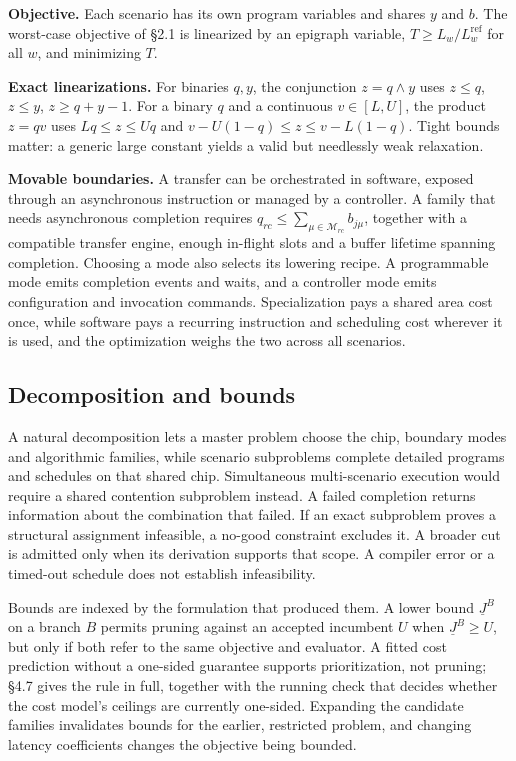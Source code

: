 \documentclass[11pt]{article}
\begin{document}
\textbf{Objective.} Each scenario has its own program variables and shares \(y\) and \(b\). The worst-case objective of §2.1 is linearized by an epigraph variable, \(T\ge L_w/L^{\mathrm{ref}}_w\) for all \(w\), and minimizing \(T\).

\textbf{Exact linearizations.} For binaries \(q,y\), the conjunction \(z=q\land y\) uses \(z\le q\), \(z\le y\), \(z\ge q+y-1\). For a binary \(q\) and a continuous \(v\in[L,U]\), the product \(z=qv\) uses \(Lq\le z\le Uq\) and \(v-U(1-q)\le z\le v-L(1-q)\). Tight bounds matter: a generic large constant yields a valid but needlessly weak relaxation.

\textbf{Movable boundaries.} A transfer can be orchestrated in software, exposed through an asynchronous instruction or managed by a controller. A family that needs asynchronous completion requires \(q_{rc}\le\sum_{\mu\in\mathcal M_{rc}}b_{j\mu}\), together with a compatible transfer engine, enough in-flight slots and a buffer lifetime spanning completion. Choosing a mode also selects its lowering recipe. A programmable mode emits completion events and waits, and a controller mode emits configuration and invocation commands. Specialization pays a shared area cost once, while software pays a recurring instruction and scheduling cost wherever it is used, and the optimization weighs the two across all scenarios.

\hypertarget{decomposition-and-bounds}{%
\subsection{Decomposition and bounds}\label{decomposition-and-bounds}}

A natural decomposition lets a master problem choose the chip, boundary modes and algorithmic families, while scenario subproblems complete detailed programs and schedules on that shared chip. Simultaneous multi-scenario execution would require a shared contention subproblem instead. A failed completion returns information about the combination that failed. If an exact subproblem proves a structural assignment infeasible, a no-good constraint excludes it. A broader cut is admitted only when its derivation supports that scope. A compiler error or a timed-out schedule does not establish infeasibility.

Bounds are indexed by the formulation that produced them. A lower bound \(\underline J^B\) on a branch \(B\) permits pruning against an accepted incumbent \(U\) when \(\underline J^B\ge U\), but only if both refer to the same objective and evaluator. A fitted cost prediction without a one-sided guarantee supports prioritization, not pruning; §4.7 gives the rule in full, together with the running check that decides whether the cost model's ceilings are currently one-sided. Expanding the candidate families invalidates bounds for the earlier, restricted problem, and changing latency coefficients changes the objective being bounded.
\end{document}

